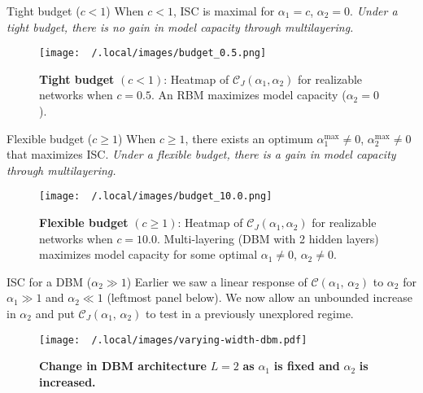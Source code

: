 \documentclass[8pt]{beamer}
\begin{document}
\begin{frame}[label={sec:org58109ed}]{Tight budget (\(c < 1\))}
When \(c < 1\), ISC is maximal for \(\alpha_{1} = c\), \(\alpha_{2} = 0\). \emph{Under a tight budget, there is no gain in model capacity through multilayering.}
\begin{figure}[htbp]
  \centering
  \texttt{[image: ~/.local/images/budget\_0.5.png]}
  \caption{\textbf{Tight budget} \((c < 1)\): Heatmap of \(\mathcal{C}_{J} (\alpha_{1}, \alpha_{2})\) for realizable networks when \(c = 0.5\). An RBM maximizes model capacity (\(\alpha_{2} = 0\)).}
\end{figure}
\end{frame}


\begin{frame}[label={sec:orgc836570}]{Flexible budget (\(c \geq 1\))}
When \(c \geq 1\), there exists an optimum \(\alpha_{1}^{\text{max}} \neq 0\), \(\alpha_{2}^{\text{max}} \neq 0\) that maximizes ISC. \emph{Under a flexible budget, there is a gain in model capacity through multilayering.}
\begin{figure}[htbp]
  \centering
  \texttt{[image: ~/.local/images/budget\_10.0.png]}
  \caption{\textbf{Flexible budget} \((c \geq 1)\): Heatmap of \(\mathcal{C}_{J} (\alpha_{1}, \alpha_{2})\) for realizable networks when \(c = 10.0\). Multi-layering (DBM with 2 hidden layers) maximizes model capacity for some optimal \(\alpha_{1} \neq 0\), \(\alpha_{2} \neq 0\).}
\end{figure}
\end{frame}


\begin{frame}[label={sec:orgfe08893}]{ISC for a DBM (\(\alpha_{2} \gg 1\))}
Earlier we saw a linear response of \(\mathcal{C}(\alpha_1,\, \alpha_2)\) to \(\alpha_{2}\) for \(\alpha_{1} \gg 1\) and \(\alpha_{2} \ll 1\) (leftmost panel below). We now allow an unbounded increase in \(\alpha_2\) and put \(\mathcal{C}_{J} (\alpha_{1},\, \alpha_{2})\) to test in a previously unexplored regime.
\begin{figure}[htbp]
    \centering
    \texttt{[image: ~/.local/images/varying-width-dbm.pdf]}
    \caption{\textbf{Change in DBM architecture} \(L = 2\) \textbf{as} \(\alpha_1\) \textbf{is fixed and} \(\alpha_2\) \textbf{is increased.}}
    \label{fig:sub2}
  \end{figure}
\end{frame}
\end{document}
